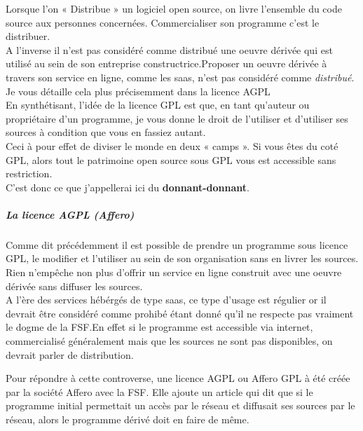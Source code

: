 						Lorsque l'on « Distribue » un logiciel open source, on livre l'ensemble du code source aux personnes concernées. Commercialiser son programme c'est le distribuer.\\

						A l'inverse il n'est pas considéré comme distribué une oeuvre dérivée qui est utilisé au sein de son entreprise constructrice.Proposer un oeuvre dérivée à travers son service en ligne, comme les \acrfull{saas}, n'est pas considéré comme \textit{distribué}.\\
						Je vous détaille cela plus précisemment dans la licence AGPL\\

						En synthétisant, l'idée de la licence GPL est que, en tant qu'auteur ou propriétaire d'un programme, je vous donne le droit de l'utiliser et d'utiliser ses sources à condition que vous en fassiez autant.\\

						Ceci à pour effet de diviser le monde en deux « camps ».
						Si vous êtes du coté GPL, alors tout le patrimoine open source sous GPL vous est accessible sans restriction.\\

						C'est donc ce que j'appellerai ici du \textbf{donnant-donnant}.

					\subparagraph{La licence AGPL (Affero)\\}
				
						Comme dit précédemment il est possible de prendre un programme sous licence GPL, le modifier et l'utiliser au sein de son organisation sans en livrer les sources. Rien n'empêche non plus d'offrir un service en ligne construit avec une oeuvre dérivée sans diffuser les sources.\\

						A l'ère des services hébérgés de type \acrshort{saas}, ce type d'usage est régulier or il devrait être considéré comme prohibé étant donné qu'il ne respecte pas vraiment le dogme de la FSF.En effet si le programme est accessible via internet, commercialisé généralement mais que les sources ne sont pas disponibles, on devrait parler de distribution.

						Pour répondre à cette controverse, une licence AGPL ou Affero GPL à été créée par la société Affero avec la FSF. Elle ajoute un article qui dit que si le programme initial permettait un accès par le réseau et diffusait ses sources par le réseau, alors le programme dérivé doit en faire de même.\\

